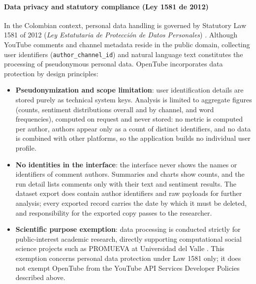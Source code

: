 
\paragraph{Data privacy and statutory compliance (Ley 1581 de 2012)}

In the Colombian context, personal data handling is governed by Statutory Law 1581 of 2012 (\textit{Ley Estatutaria de Protección de Datos Personales}) \autocite{ley1581_2012}. Although YouTube comments and channel metadata reside in the public domain, collecting user identifiers (\texttt{author\_channel\_id}) and natural language text constitutes the processing of pseudonymous personal data. OpenTube incorporates data protection by design principles:

\begin{itemize}
    \item \textbf{Pseudonymization and scope limitation}: user identification details are stored purely as technical system keys. Analysis is limited to aggregate figures (counts, sentiment distributions overall and by channel, and word frequencies), computed on request and never stored: no metric is computed per author, authors appear only as a count of distinct identifiers, and no data is combined with other platforms, so the application builds no individual user profile.

    \item \textbf{No identities in the interface}: the interface never shows the names or identifiers of comment authors. Summaries and charts show counts, and the run detail lists comments only with their text and sentiment results. The dataset export does contain author identifiers and raw payloads for further analysis; every exported record carries the date by which it must be deleted, and responsibility for the exported copy passes to the researcher.

    \item \textbf{Scientific purpose exemption}: data processing is conducted strictly for public-interest academic research, directly supporting computational social science projects such as PROMUEVA at Universidad del Valle \autocite{promueva_project}. This exemption concerns personal data protection under Law 1581 only; it does not exempt OpenTube from the YouTube API Services Developer Policies described above.
\end{itemize}
